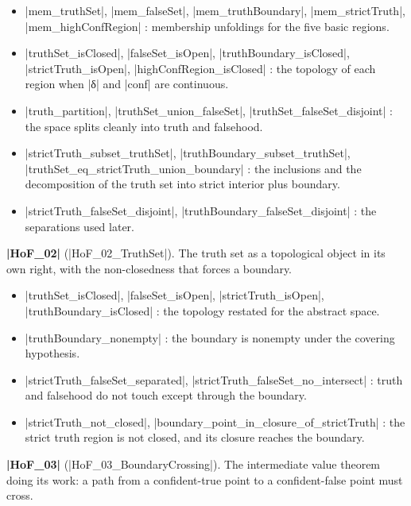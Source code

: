 \documentclass{memoir}
\begin{document}
\begin{itemize}
\item \LeanVerb|mem_truthSet|, \LeanVerb|mem_falseSet|, \LeanVerb|mem_truthBoundary|, \LeanVerb|mem_strictTruth|,
   \LeanVerb|mem_highConfRegion| : membership unfoldings for the five basic regions.
\item \LeanVerb|truthSet_isClosed|, \LeanVerb|falseSet_isOpen|, \LeanVerb|truthBoundary_isClosed|,
   \LeanVerb|strictTruth_isOpen|, \LeanVerb|highConfRegion_isClosed| : the topology of each region
   when \LeanVerb|δ| and \LeanVerb|conf| are continuous.
\item \LeanVerb|truth_partition|, \LeanVerb|truthSet_union_falseSet|, \LeanVerb|truthSet_falseSet_disjoint| : the
   space splits cleanly into truth and falsehood.
\item \LeanVerb|strictTruth_subset_truthSet|, \LeanVerb|truthBoundary_subset_truthSet|,
   \LeanVerb|truthSet_eq_strictTruth_union_boundary| : the inclusions and the decomposition
   of the truth set into strict interior plus boundary.
\item \LeanVerb|strictTruth_falseSet_disjoint|, \LeanVerb|truthBoundary_falseSet_disjoint| : the
   separations used later.

\end{itemize}


\textbf{\LeanVerb|HoF_02|} (\LeanVerb|HoF_02_TruthSet|). The truth set as a topological object in its own
right, with the non-closedness that forces a boundary.

\begin{itemize}
\item \LeanVerb|truthSet_isClosed|, \LeanVerb|falseSet_isOpen|, \LeanVerb|strictTruth_isOpen|,
   \LeanVerb|truthBoundary_isClosed| : the topology restated for the abstract space.
\item \LeanVerb|truthBoundary_nonempty| : the boundary is nonempty under the covering
   hypothesis.
\item \LeanVerb|strictTruth_falseSet_separated|, \LeanVerb|strictTruth_falseSet_no_intersect| : truth and
   falsehood do not touch except through the boundary.
\item \LeanVerb|strictTruth_not_closed|, \LeanVerb|boundary_point_in_closure_of_strictTruth| : the strict
   truth region is not closed, and its closure reaches the boundary.

\end{itemize}


\textbf{\LeanVerb|HoF_03|} (\LeanVerb|HoF_03_BoundaryCrossing|). The intermediate value theorem doing its
work: a path from a confident-true point to a confident-false point must cross.
\end{document}
